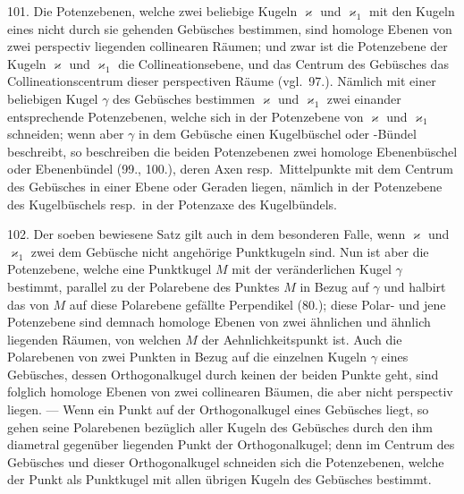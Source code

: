 101. Die Potenzebenen, welche zwei beliebige Kugeln
$\varkappa$ und $\varkappa_1$ mit den Kugeln eines nicht durch sie gehenden
Geb\"usches bestimmen, sind homologe Ebenen von zwei
perspectiv liegenden collinearen R\"aumen; und zwar ist die
Potenzebene der Kugeln $\varkappa$ und $\varkappa_1$ die Collineationsebene, und
das Centrum des Geb\"usches das Collineationscentrum dieser
perspectiven R\"aume (vgl.~97.). N\"amlich mit einer beliebigen
Kugel $\gamma$ des Geb\"usches bestimmen $\varkappa$ und $\varkappa_1$ zwei einander
entsprechende Potenzebenen, welche sich in der Potenzebene
von $\varkappa$ und $\varkappa_1$ schneiden; wenn aber $\gamma$ in dem Geb\"usche
einen Kugelb\"uschel oder -B\"undel beschreibt, so beschreiben
die beiden Potenzebenen zwei homologe Ebenenb\"uschel oder
Ebenenb\"undel (99., 100.), deren Axen resp.\ Mittelpunkte mit
dem Centrum des Geb\"usches in einer Ebene oder Geraden
liegen, n\"amlich in der Potenzebene des Kugelb\"uschels resp.\ in
der Potenzaxe des Kugelb\"undels.

102. Der soeben bewiesene Satz gilt auch in dem besonderen
Falle, wenn $\varkappa$ und $\varkappa_1$ zwei dem Geb\"usche nicht angeh\"orige
Punktkugeln sind. Nun ist aber die Potenzebene,
welche eine Punktkugel $M$ mit der ver\"anderlichen Kugel $\gamma$
bestimmt, parallel zu der Polarebene des Punktes $M$ in Bezug
auf $\gamma$ und halbirt das von $M$ auf diese Polarebene gef\"allte
Perpendikel (80.); diese Polar- und jene Potenzebene
sind demnach homologe Ebenen von zwei \"ahnlichen und
\"ahnlich liegenden R\"aumen, von welchen $M$ der Aehnlichkeitspunkt
ist. Auch die Polarebenen von zwei Punkten in Bezug
auf die einzelnen Kugeln $\gamma$ eines Geb\"usches, dessen Orthogonalkugel
durch keinen der beiden Punkte geht, sind folglich
homologe Ebenen von zwei collinearen B\"aumen, die aber
nicht perspectiv liegen. --- Wenn ein Punkt auf der Orthogonalkugel
eines Geb\"usches liegt, so gehen seine Polarebenen
bez\"uglich aller Kugeln des Geb\"usches durch den ihm
diametral gegen\"uber liegenden Punkt der Orthogonalkugel;
denn im Centrum des Geb\"usches und dieser Orthogonalkugel
schneiden sich die Potenzebenen, welche der Punkt als Punktkugel
mit allen \"ubrigen Kugeln des Geb\"usches bestimmt.

